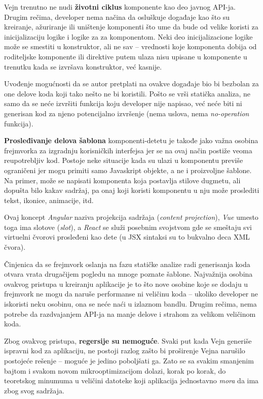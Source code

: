 Vejn trenutno ne nudi \textbf{životni ciklus} komponente kao deo javnog API-ja.
Drugim rečima, developer nema načina da osluškuje događaje kao što su kreiranje, ažuriranje ili uništenje komponenti što ume da bude od velike koristi za inicijalizaciju logike i logike za  za komponentom.
Neki deo inicijalizacione logike može se smestiti u konstruktor, ali ne sav -- vrednosti koje komponenta dobija od roditeljske komponente ili direktive putem ulaza nisu upisane u komponente u trenutku kada se izvršava konstruktor, već kasnije.

Uvođenje mogućnosti da se autor pretplati na ovakve događaje bio bi bezbolan za one delove koda koji tako nešto ne bi koristili.
Pošto se vrši statička analiza, ne samo da se neće izvršiti funkcija koju developer nije napisao, već neće biti ni generisan kod za njeno potencijalno izvršenje (nema uslova, nema \textsl{no-operation} funkcija).

\textbf{Prosleđivanje delova šablona} komponenti-detetu je takođe jako važna osobina frejmvorka za izgradnju korisničkih interfejsa jer se na ovaj način postiže veoma reupotrebljiv kod.
Postoje neke situacije kada su ulazi u komponentu previše ograničeni jer mogu primiti samo Javaskript objekte, a ne i proizvoljne šablone.
Na primer, može se napisati komponenta koja postavlja stilove dugmetu, ali dopušta bilo kakav sadržaj, pa onaj koji koristi komponentu u nju može proslediti tekst, ikonice, animacije, itd.

Ovaj koncept \textsl{Angular} naziva projekcija sadržaja (\textsl{content projection}), \textsl{Vue} umesto toga ima slotove (\textsl{slot}), a \textsl{React} se služi posebnim svojstvom  gde se smeštaju svi virtuelni čvorovi prosleđeni kao dete (u JSX sintaksi su to bukvalno deca XML čvora).

Činjenica da se frejmvork oslanja na fazu statičke analize radi generisanja koda otvara vrata drugačijem pogledu na mnoge poznate šablone.
Najvažnija osobina ovakvog pristupa u kreiranju aplikacije je to što nove osobine koje se dodaju u frejmvork ne mogu da naruše performanse ni veličinu koda -- ukoliko developer ne iskoristi neku osobinu, ona se neće naći u izlaznom bandlu.
Drugim rečima, nema potrebe da razdvajanjem API-ja na manje delove i strahom za velikom veličinom koda.

Zbog ovakvog pristupa, \textbf{regersije su nemoguće}.
Svaki put kada Vejn generiše ispravni kod za aplikaciju, ne postoji razlog zašto bi proširenje Vejna narušilo postojeće rešenje -- moguće je jedino poboljšati ga.
Zato se sa svakim smanjenim bajtom i svakom novom mikrooptimizacijom dolazi, korak po korak, do teoretskog minumuma u veličini datoteke koji aplikacija jednostavno \emph{mora} da ima zbog svog sadržaja.

